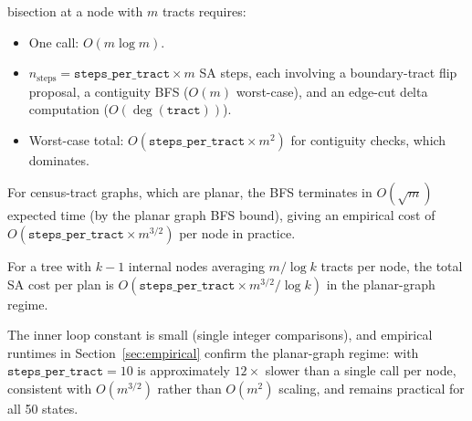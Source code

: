 \begin{proposition}
\label{prop:runtime}
\sa{} bisection at a node with $m$ tracts requires:
\begin{itemize}
\item One \metis{} call: $O(m \log m)$.
\item $n_{\mathrm{steps}} = \mathtt{steps\_per\_tract} \times m$ SA steps,
  each involving a boundary-tract flip proposal, a contiguity BFS
  ($O(m)$ worst-case), and an edge-cut delta computation ($O(\deg(\mathtt{tract}))$).
\item Worst-case total: $O(\mathtt{steps\_per\_tract} \times m^2)$ for
  contiguity checks, which dominates.
\end{itemize}
For census-tract graphs, which are planar, the BFS terminates in
$O(\sqrt{m})$ expected time (by the planar graph BFS bound), giving an
empirical cost of $O(\mathtt{steps\_per\_tract} \times m^{3/2})$ per node
in practice.

For a tree with $k-1$ internal nodes averaging $m/\log k$ tracts per node,
the total SA cost per plan is $O(\mathtt{steps\_per\_tract} \times m^{3/2} / \log k)$
in the planar-graph regime.
\end{proposition}

\begin{remark}
The inner loop constant is small (single integer comparisons), and empirical
runtimes in Section~\ref{sec:empirical} confirm the planar-graph regime:
\sa{} with $\mathtt{steps\_per\_tract} = 10$ is approximately $12\times$
slower than a single \metis{} call per node, consistent with $O(m^{3/2})$
rather than $O(m^2)$ scaling, and remains practical for all 50 states.
\end{remark}
